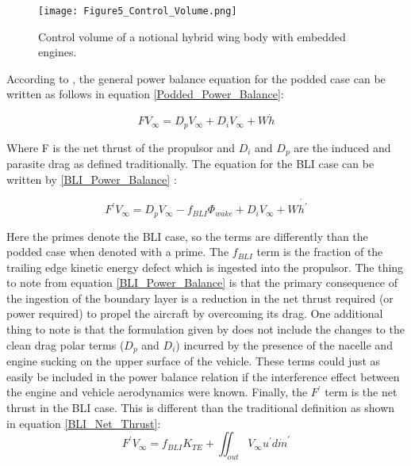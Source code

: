 	\begin{figure}[htpb]
	\centering
	\texttt{[image: Figure5\_Control\_Volume.png]}
	\caption{Control volume of a notional hybrid wing body with embedded engines.}
	\label{Control_Volume}
	\end{figure}

According to \cite{Plas2007}, the general power balance equation for the podded case can be written as follows in equation \ref{Podded_Power_Balance}:

   \begin{equation}FV_\infty = D_{p}V_\infty + D_{i} V_\infty + W\dot{h}\label{Podded_Power_Balance}\end{equation}%

Where F is the net thrust of the propulsor and $D_i$ and $D_p$ are the induced and parasite drag as defined traditionally.  The equation for the BLI case can be written by \ref{BLI_Power_Balance} \cite{Plas2007}:

   \begin{equation}F^\prime V_\infty = D_p V_\infty - f_{BLI}\Phi_{wake} + D_{i} V_\infty + W\dot{h^\prime}\label{BLI_Power_Balance}\end{equation}%

Here the primes denote the BLI case, so the terms are differently than the podded case when denoted with a prime.  The $f_{BLI}$ term is the fraction of the trailing edge kinetic energy defect which is ingested into the propulsor.  The thing to note from equation \ref{BLI_Power_Balance} is that the primary consequence of the ingestion of the boundary layer is a reduction in the net thrust required (or power required) to propel the aircraft by overcoming its drag.  One additional thing to note is that the formulation given by \cite{Plas2007} does not include the changes to the clean drag polar terms ($D_p$ and $D_i$) incurred by the presence of the nacelle and engine sucking on the upper surface of the vehicle.  These terms could just as easily be included in the power balance relation if the interference effect between the engine and vehicle aerodynamics were known.  Finally, the $F^\prime$ term is the net thrust in the BLI case.  This is different than the traditional definition as shown in equation \ref{BLI_Net_Thrust}:
 \begin{equation}F^\prime V_\infty = f_{BLI}K_{TE} + \iint_{out}{V_\infty}u^\prime d\dot{m}^\prime\label{BLI_Net_Thrust}\end{equation}%

